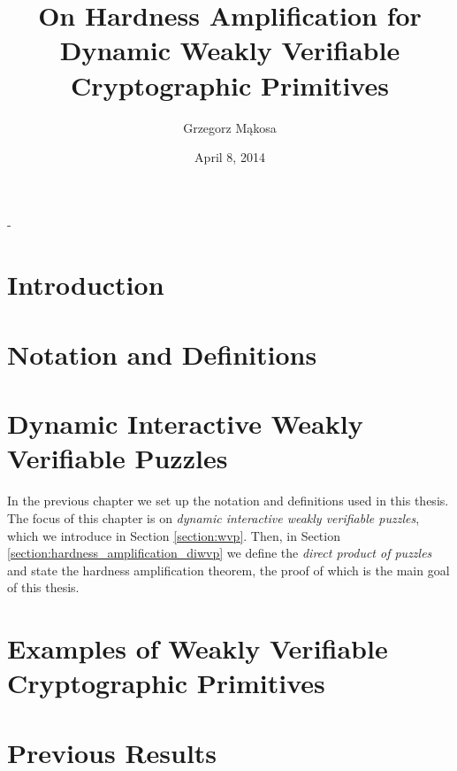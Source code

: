 \documentclass[11pt,a4paper,titlepage]{memoir}
\title{On Hardness Amplification for Dynamic Weakly Verifiable Cryptographic Primitives}
\author{Grzegorz M\k{a}kosa}
\date{April 8, 2014}
\begin{document}
\frontmatter

\begin{titlingpage}
  \calccentering{\unitlength}
  \begin{adjustwidth*}{\unitlength-24pt}{-\unitlength-24pt}
    \maketitle
  \end{adjustwidth*}
\end{titlingpage}


%

%
\cleartorecto
\tableofcontents
\mainmatter
%
\chapter{Introduction}
\label{ch:introduction}

%
\chapter{Notation and Definitions}
\label{ch:preliminaries}

%
\chapter{Dynamic Interactive Weakly Verifiable Puzzles}
\label{ch:diwvp_main_thm}
In the previous chapter we set up the notation and definitions used in this thesis.
The focus of this chapter is on \textit{dynamic interactive weakly verifiable puzzles}, which we introduce in Section \ref{section:wvp}.
Then, in Section \ref{section:hardness_amplification_diwvp} we define the \textit{direct product of puzzles}
and state the hardness amplification theorem, the proof of which is the main goal of this thesis.
%

%
\chapter{Examples of Weakly Verifiable Cryptographic Primitives}
\label{ch:examples_wvcp}

%
\chapter{Previous Results}
\label{ch:previous_results}

%
\end{document}
